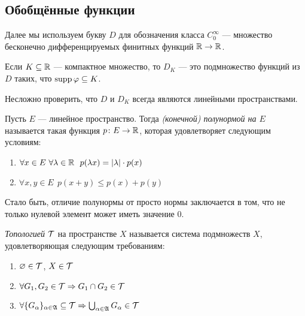 \subsection{Обобщённые функции}

\begin{note}
	Далее мы используем букву $D$ для обозначения класса $C_0^\infty$ --- множество бесконечно дифференцируемых финитных функций $\mathbb{R} \to \mathbb{R}$.
\end{note}

\begin{note}
	Если $K \subseteq \mathbb{R}$ --- компактное множество, то $D_K$ --- это подмножество функций из $D$ таких, что $\operatorname{supp} \varphi \subseteq K$.
\end{note}

\begin{note}
	Несложно проверить, что $D$ и $D_K$ всегда являются линейными пространствами.
\end{note}

\begin{definition}
	Пусть $E$ --- линейное пространство. Тогда \textit{(конечной) полунормой на $E$} называется такая функция $p \colon E \to \mathbb{R}$, которая удовлетворяет следующим условиям:
	\begin{enumerate}
		\item $\forall x \in E\ \forall \lambda \in \mathbb{R}\ \ p(\lambda x) = |\lambda| \cdot p(x)$
		
		\item $\forall x, y \in E\ \ p(x + y) \le p(x) + p(y)$
	\end{enumerate}
\end{definition}

\begin{note}
	Стало быть, отличие полунормы от просто нормы заключается в том, что не только нулевой элемент может иметь значение 0.
\end{note}

\begin{reminder}
	\textit{Топологией} $\mathcal{T}$ на пространстве $X$ называется система подмножеств $X$, удовлетворяющая следующим требованиям:
	\begin{enumerate}
		\item $\varnothing \in \mathcal{T}$, $X \in \mathcal{T}$
		
		\item $\forall G_1, G_2 \in \mathcal{T} \Rightarrow G_1 \cap G_2 \in \mathcal{T}$
		
		\item $\forall \{G_\alpha\}_{\alpha \in \mathfrak{A}} \subseteq \mathcal{T} \Rightarrow \bigcup_{\alpha \in \mathfrak{A}} G_\alpha \in \mathcal{T}$
	\end{enumerate}
\end{reminder}

